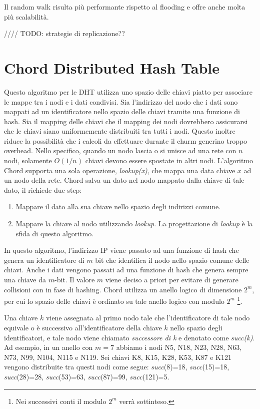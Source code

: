 Il random walk risulta più performante rispetto al flooding e offre
anche molta più scalabilità.

//// TODO: strategie di replicazione??

\section{Chord Distributed Hash
Table}\label{chord-distributed-hash-table}

Questo algoritmo per le DHT utilizza uno spazio delle chiavi piatto per
associare le mappe tra i nodi e i dati condivisi. Sia l'indirizzo del
nodo che i dati sono mappati ad un identificatore nello spazio delle
chiavi tramite una funzione di hash. Sia il mapping delle chiavi che il
mapping dei nodi dovrebbero assicurarsi che le chiavi siano
uniformemente distribuiti tra tutti i nodi. Questo inoltre riduce la
possibilità che i calcoli da effettuare durante il churm generino troppo
overhead. Nello specifico, quando un nodo lascia o si unisce ad una rete
con $n$ nodi, solamente $O(1/n)$ chiavi devono essere spostate in altri
nodi. L'algoritmo Chord supporta una sola operazione, \emph{lookup(x)},
che mappa una data chiave $x$ ad un nodo della rete. Chord salva un dato
nel nodo mappato dalla chiave di tale dato, il richiede due step:

\begin{enumerate}
\def\labelenumi{\arabic{enumi}.}
\itemsep1pt\parskip0pt
\item
  Mappare il dato alla sua chiave nello spazio degli indirizzi comune.
\item
  Mappare la chiave al nodo utilizzando \emph{lookup}. La progettazione
  di \emph{lookup} è la sfida di questo algoritmo.
\end{enumerate}

In questo algoritmo, l'indirizzo IP viene passato ad una funzione di
hash che genera un identificatore di $m$ bit che identifica il nodo
nello spazio comune delle chiavi. Anche i dati vengono passati ad una
funzione di hash che genera sempre una chiave da $m$-bit. Il valore $m$
viene deciso a priori per evitare di generare collisioni con in fase di
hashing. Chord utilizza un anello logico di dimensione $2^m$, per cui lo
spazio delle chiavi è ordinato su tale anello logico con modulo $2^m$
\footnote{Nei successivi conti il modulo $2^m$ verrà sottinteso.}.

Una chiave $k$ viene assegnata al primo nodo tale che l'identificatore
di tale nodo equivale o è successivo all'identificatore della chiave $k$
nello spazio degli identificatori, e tale nodo viene chiamato
\emph{successore di k} e denotato come \emph{succ(k)}. Ad esempio, in un
anello con $m=7$ abbiamo i nodi N5, N18, N23, N28, N63, N73, N99, N104,
N115 e N119. Sei chiavi K8, K15, K28, K53, K87 e K121 vengono
distribuite tra questi nodi come segue: \emph{succ}(8)=18,
\emph{succ}(15)=18, \emph{succ}(28)=28, \emph{succ}(53)=63,
\emph{succ}(87)=99, \emph{succ}(121)=5.

